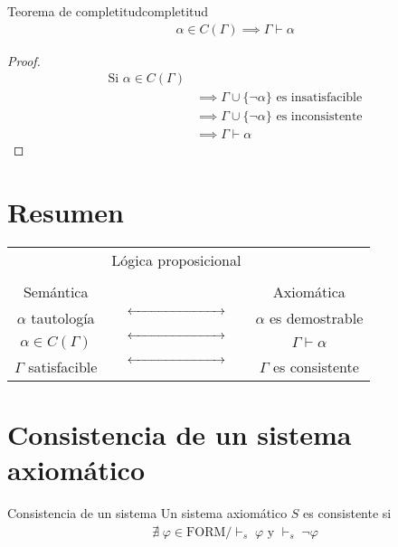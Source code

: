 \begin{teorema}{Teorema de completitud}{completitud}
   \begin{gather*}
       \alpha \in C(\Gamma) \implies \Gamma \vdash \alpha
   \end{gather*} 
\end{teorema}


\begin{proof} \phantom{.}

    \begin{align*}
        \text{Si } \alpha \in C(\Gamma) & \\
        &\implies \Gamma \cup \{ \neg\alpha \} \text{ es insatisfacible} \\
        &\implies \Gamma \cup \{\neg\alpha\} \text{ es inconsistente} \\
        &\implies \Gamma \vdash \alpha
    \end{align*}
\end{proof}

\section{Resumen}

\begin{center}
   \renewcommand{\arraystretch}{1.5}
    \begin{tabular}{c c c}
        & Lógica proposicional & \\
        && \\
        Semántica & & Axiomática \\
        $\alpha$ tautología & 
        $\xleftrightarrow[\text{\phantom{Lógica proposicional}}]{}$ & 
        $\alpha$ es demostrable \\
        $\alpha \in C(\Gamma)$ & 
        $\xleftrightarrow[\text{\phantom{Lógica proposicional}}]{}$ & 
        $\Gamma \vdash \alpha$ \\
        $\Gamma$ satisfacible & 
        $\xleftrightarrow[\text{\phantom{Lógica proposicional}}]{}$ & 
        $\Gamma$ es consistente
    \end{tabular}
\end{center}

\section{Consistencia de un sistema axiomático}

\begin{definicion}{Consistencia de un sistema}{}
    Un sistema axiomático $S$ es consistente si
    \begin{gather*}
        \nexists \; \varphi \in \mathrm{FORM} / {\vdash}_{s}\; \varphi 
        \text{ y } {\vdash}_{s}\; \neg\varphi
    \end{gather*}

\end{definicion}

